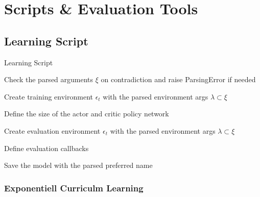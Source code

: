 \newpage

\section{Scripts \& Evaluation Tools} \label{sec:scripts}



\subsection{Learning Script}
\begin{algorithm}
	\caption{Learning Script}
	\label{alg:learn}
	 
	 Check the parsed arguments $\xi$ on contradiction and raise ParsingError if needed
	 
	 Create training environment $\epsilon_t$ with the parsed environment args $\lambda \subset \xi$
	 
	 Define the size of the actor and critic policy network
	 
	 
	 Create evaluation environment $\epsilon_t$ with the parsed environment args $\lambda \subset \xi$
	 
	 Define evaluation callbacks
	 
	 
	 Save the model with the parsed preferred name
	 
	 
\end{algorithm}

\newpage

\subsubsection{Exponentiell Curriculm Learning}

